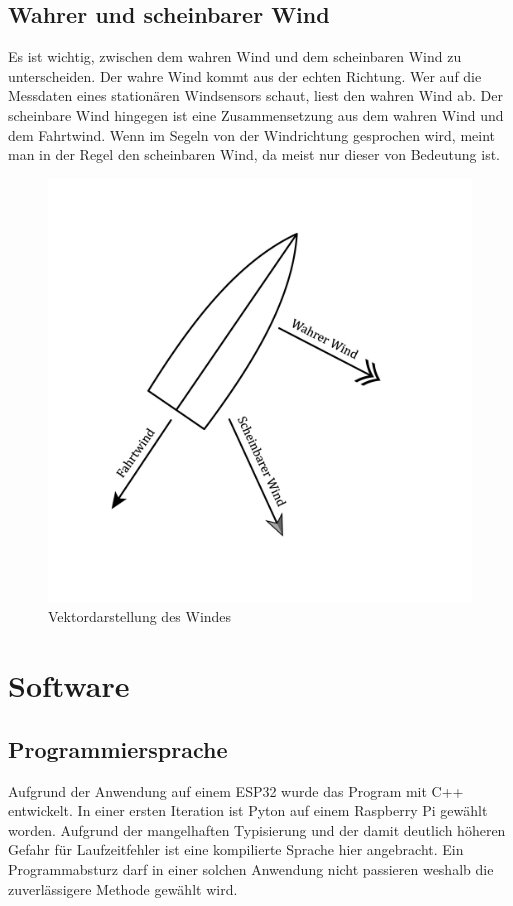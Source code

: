 \subsection{Wahrer und scheinbarer Wind}
Es ist wichtig, zwischen dem wahren Wind und dem scheinbaren Wind zu unterscheiden. Der wahre Wind kommt aus der echten Richtung. Wer auf die Messdaten eines stationären Windsensors schaut, liest den wahren Wind ab. Der scheinbare Wind hingegen ist eine Zusammensetzung aus dem wahren Wind und dem Fahrtwind. Wenn im Segeln von der Windrichtung gesprochen wird, meint man in der Regel den scheinbaren Wind, da meist nur dieser von Bedeutung ist.
\begin{figure}
    \centering
    \includegraphics[width=0.75\linewidth]{assets/scheinbarerwind.png}
    \caption{Vektordarstellung des Windes}
    
\end{figure}

\section{Software}
\subsection{Programmiersprache}
Aufgrund der Anwendung auf einem ESP32 wurde das Program mit C++ entwickelt. In einer ersten Iteration ist Pyton auf einem Raspberry Pi gewählt worden. Aufgrund der mangelhaften Typisierung und der damit deutlich höheren Gefahr für Laufzeitfehler ist eine kompilierte Sprache hier angebracht. Ein Programmabsturz darf in einer solchen Anwendung nicht passieren weshalb die zuverlässigere Methode gewählt wird. 

